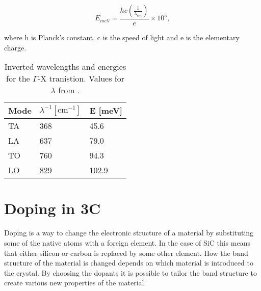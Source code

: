 \[E_{meV} = \frac{hc(\frac{1}{\lambda_{cm}})}{e}\times 10^5,\]

\noindent where h is Planck's constant, c is the speed of light and e is the elementary charge. 

\begin{table}[h]
\caption{Inverted wavelengths and energies for the $\Gamma$-X tranistion. Values for $\lambda$ from \cite{Karch1994}.}
\label{tab:phonons}
\begin{center}
\begin{tabular}{ l l l }
  \hline                       
  \hline       
  \vspace{1mm}
    Mode  & $\lambda^{-1} [\mathrm{cm}^{-1}]$  & E [meV]\\
    \hline
  TA &  368 & 45.6\\
  LA &  637 & 79.0\\
  TO &  760 & 94.3\\
  LO &  829 & 102.9\\
  \hline  
\end{tabular}
\end{center}
\end{table}









\section{Doping in 3C}
\label{sec:doping_in_3C}

	


Doping is a way to change the electronic structure of a material by substituting some of the native atoms with a foreign element. In the case of SiC this means that either silicon or carbon is replaced by some other element. How the band structure of the material is changed depends on which material is introduced to the crystal. By choosing the dopants it is possible to tailor the band structure to create various new properties of the material. 

